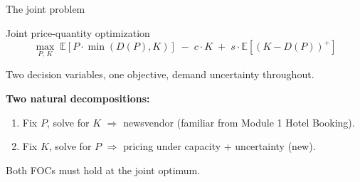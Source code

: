 \documentclass[aspectratio=169, 11pt, handout]{beamer}
\newcommand{\E}{\mathbb{E}}
\begin{document}




\begin{frame}{The joint problem}
\begin{block}{Joint price-quantity optimization}
\[
\max_{P, \,K} \; \E\left[ P \cdot \min(D(P), K) \right] \;-\; c \cdot K \;+\; s \cdot \E\left[(K - D(P))^+\right]
\]
\end{block}
\vspace{0.4em}

Two decision variables, one objective, demand uncertainty throughout.
\vspace{0.6em}

\textbf{Two natural decompositions:}
\begin{enumerate}
    \item Fix $P$, solve for $K$ $\Rightarrow$ newsvendor (familiar from Module 1 Hotel Booking).
    \item Fix $K$, solve for $P$ $\Rightarrow$ pricing under capacity + uncertainty (new).
\end{enumerate}
\vspace{0.4em}

Both FOCs must hold at the joint optimum.
\end{frame}
\end{document}
